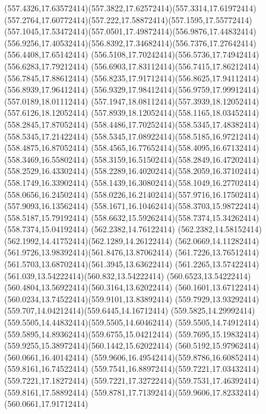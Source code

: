 {{	\curveto(557.4326,17.63572414)(557.3822,17.62572414)(557.3314,17.61972414)
	\curveto(557.2764,17.60772414)(557.222,17.58872414)(557.1595,17.55772414)
	\curveto(557.1045,17.53472414)(557.0501,17.49872414)(556.9876,17.44832414)
	\curveto(556.9256,17.40532414)(556.8392,17.34682414)(556.7376,17.27642414)
	\lineto(556.4408,17.65142414)
	\curveto(556.5108,17.70242414)(556.5736,17.74942414)(556.6283,17.79212414)
	\curveto(556.6903,17.83112414)(556.7415,17.86212414)(556.7845,17.88612414)
	\curveto(556.8235,17.91712414)(556.8625,17.94112414)(556.8939,17.96412414)
	\curveto(556.9329,17.98412414)(556.9759,17.99912414)(557.0189,18.01112414)
	\curveto(557.1947,18.08112414)(557.3939,18.12052414)(557.6126,18.12052414)
	\curveto(557.8939,18.12052414)(558.1165,18.03452414)(558.2845,17.87052414)
	\curveto(558.4486,17.70252414)(558.5345,17.48382414)(558.5345,17.21422414)
	\curveto(558.5345,17.08922414)(558.5185,16.97212414)(558.4875,16.87052414)
	\curveto(558.4565,16.77652414)(558.4095,16.67132414)(558.3469,16.55802414)
	\curveto(558.3159,16.51502414)(558.2849,16.47202414)(558.2529,16.43302414)
	\curveto(558.2289,16.40202414)(558.2059,16.37102414)(558.1749,16.33902414)
	\curveto(558.1439,16.30802414)(558.1049,16.27702414)(558.0656,16.24502414)
	\curveto(558.0226,16.21402414)(557.9716,16.17502414)(557.9093,16.13562414)
	\curveto(558.1671,16.10462414)(558.3703,15.98722414)(558.5187,15.79192414)
	\curveto(558.6632,15.59262414)(558.7374,15.34262414)(558.7374,15.04192414)
	\closepath
	\moveto(562.2382,14.76122414)
	\curveto(562.2382,14.58152414)(562.1992,14.41752414)(562.1289,14.26122414)
	\curveto(562.0669,14.11282414)(561.9726,13.98392414)(561.8476,13.87062414)
	\curveto(561.7226,13.76512414)(561.5703,13.68702414)(561.3945,13.63622414)
	\curveto(561.2265,13.57422414)(561.039,13.54222414)(560.832,13.54222414)
	\curveto(560.6523,13.54222414)(560.4804,13.56922414)(560.3164,13.62022414)
	\curveto(560.1601,13.67122414)(560.0234,13.74522414)(559.9101,13.83892414)
	\curveto(559.7929,13.93292414)(559.707,14.04212414)(559.6445,14.16712414)
	\curveto(559.5825,14.29992414)(559.5505,14.44832414)(559.5505,14.60462414)
	\curveto(559.5505,14.74912414)(559.5895,14.89362414)(559.6755,15.04212414)
	\curveto(559.7695,15.19832414)(559.9255,15.38972414)(560.1442,15.62022414)
	\lineto(560.5192,15.97962414)
	\lineto(560.0661,16.40142414)
	\curveto(559.9606,16.49542414)(559.8786,16.60852414)(559.8161,16.74522414)
	\curveto(559.7541,16.88972414)(559.7221,17.03432414)(559.7221,17.18272414)
	\curveto(559.7221,17.32722414)(559.7531,17.46392414)(559.8161,17.58892414)
	\curveto(559.8781,17.71392414)(559.9606,17.82332414)(560.0661,17.91712414)
}}
